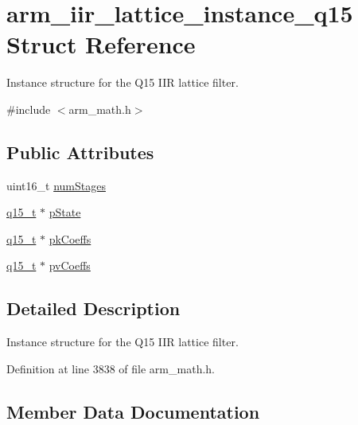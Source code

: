 \hypertarget{structarm__iir__lattice__instance__q15}{}\section{arm\+\_\+iir\+\_\+lattice\+\_\+instance\+\_\+q15 Struct Reference}
\label{structarm__iir__lattice__instance__q15}


Instance structure for the Q15 I\+IR lattice filter.  




{\ttfamily \#include $<$arm\+\_\+math.\+h$>$}

\subsection*{Public Attributes}
\begin{DoxyCompactItemize}
\item 
uint16\+\_\+t \hyperlink{structarm__iir__lattice__instance__q15_a96fbed313bef01070409fa182d26ba3f}{num\+Stages}
\item 
\hyperlink{arm__math_8h_ab5a8fb21a5b3b983d5f54f31614052ea}{q15\+\_\+t} $\ast$ \hyperlink{structarm__iir__lattice__instance__q15_afd0136ab917b529554d93f41a5e04618}{p\+State}
\item 
\hyperlink{arm__math_8h_ab5a8fb21a5b3b983d5f54f31614052ea}{q15\+\_\+t} $\ast$ \hyperlink{structarm__iir__lattice__instance__q15_a41c214a1ec38d4a82fae8899d715dd29}{pk\+Coeffs}
\item 
\hyperlink{arm__math_8h_ab5a8fb21a5b3b983d5f54f31614052ea}{q15\+\_\+t} $\ast$ \hyperlink{structarm__iir__lattice__instance__q15_a4c4f57f45b223abbe2a9fb727bd2cad9}{pv\+Coeffs}
\end{DoxyCompactItemize}


\subsection{Detailed Description}
Instance structure for the Q15 I\+IR lattice filter. 

Definition at line 3838 of file arm\+\_\+math.\+h.



\subsection{Member Data Documentation}
\mbox{\label{structarm__iir__lattice__instance__q15_a96fbed313bef01070409fa182d26ba3f}} 
